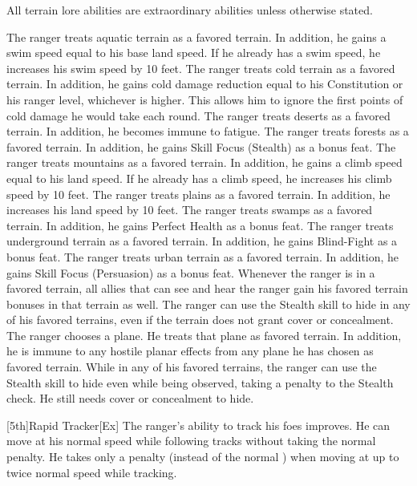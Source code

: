 All terrain lore abilities are extraordinary abilities unless otherwise stated.

The ranger treats aquatic terrain as a favored terrain.
In addition, he gains a swim speed equal to his base land speed.
If he already has a swim speed, he increases his swim speed by 10 feet.
The ranger treats cold terrain as a favored terrain.
In addition, he gains cold damage reduction equal to his Constitution or his ranger level, whichever is higher.
This allows him to ignore the first points of cold damage he would take each round.
The ranger treats deserts as a favored terrain.
In addition, he becomes immune to fatigue.
The ranger treats forests as a favored terrain.
In addition, he gains Skill Focus (Stealth) as a bonus feat.
The ranger treats mountains as a favored terrain.
In addition, he gains a climb speed equal to his land speed.
If he already has a climb speed, he increases his climb speed by 10 feet.
The ranger treats plains as a favored terrain.
In addition, he increases his land speed by 10 feet.
The ranger treats swamps as a favored terrain.
In addition, he gains Perfect Health as a bonus feat.
The ranger treats underground terrain as a favored terrain.
In addition, he gains Blind-Fight as a bonus feat.
The ranger treats urban terrain as a favored terrain.
In addition, he gains Skill Focus (Persuasion) as a bonus feat.
Whenever the ranger is in a favored terrain, all allies that can see and hear the ranger gain his favored terrain bonuses in that terrain as well.
The ranger can use the Stealth skill to hide in any of his favored terrains, even if the terrain does not grant cover or concealment.
The ranger chooses a plane.
He treats that plane as favored terrain.
In addition, he is immune to any hostile planar effects from any plane he has chosen as favored terrain.
While in any of his favored terrains, the ranger can use the Stealth skill to hide even while being observed, taking a  penalty to the Stealth check.
He still needs cover or concealment to hide.

[5th]{Rapid Tracker}[Ex]
The ranger's ability to track his foes improves.
He can move at his normal speed while following tracks without taking the normal  penalty.
He takes only a  penalty (instead of the normal ) when moving at up to twice normal speed while tracking.

